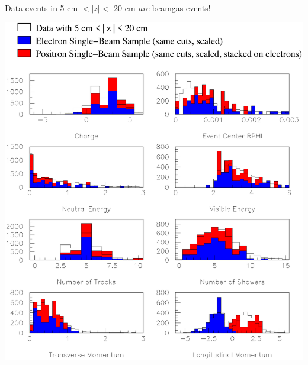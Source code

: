 

\begin{slide*}

\slideframe{}
\huge
{}

\begin{minipage}[t]{\linewidth}
\Large

Data events in 5 cm $< |z| <$ 20 cm {\it are} beamgas events!

\vspace{0.65cm}

\begin{center}
  \includegraphics[width=\linewidth]{check_beamgas2.eps}
\end{center}

\end{minipage}

\end{slide*}


